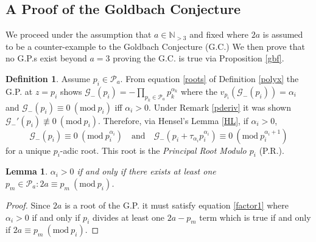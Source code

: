\documentclass[12pt,a4paper]{amsart}
\numberwithin{equation}{section}
\theoremstyle{theorem}
\theoremstyle{definition}
\newtheorem{definition}{Definition}
\newtheorem{lemma}{Lemma}
\theoremstyle{remark}
\theoremstyle{con}
\newcommand{\Mod}[1]{\ (\mathrm{mod}\ #1)}
\begin{document}
 
 
 \subsection{A Proof of the Goldbach Conjecture}
  
 We proceed under the assumption that $a \in \mathbb{N}_{>3}$ and fixed where $2a$ is assumed to be a counter-example to the Goldbach Conjecture (G.C.) We then prove that no G.P.s exist beyond $a = 3$ proving the G.C. is true via Proposition \ref{gbf}.
 
 
\begin{definition}\label{pr}
Assume $p_i \in \mathcal{P}_a$. From equation \ref{roots} of Definition \ref{polyx} the G.P. at $z = p_i$ shows $\mathcal{G}_-(p_i) = - \prod_{p_k \in \mathcal{P}_a}p_k^{\alpha_k}$ where the $v_{p_i}(\mathcal{G}_-(p_i)) = \alpha_i$ and $\mathcal{G}_-(p_i) \equiv 0 \Mod{p_i}$ iff $\alpha_i > 0$. Under Remark \ref{pderiv} it was shown $\mathcal{G}_-'(p_i) \not \equiv 0 \Mod{p_i}$. Therefore, via Hensel's Lemma \ref{HL}, if $\alpha_i > 0$,
\begin{equation}\label{pr0}
\mathcal{G}_-(p_i) \equiv 0 \Mod{p_i^{\alpha_i}} \quad \text{and} \quad \mathcal{G}_-(p_i + \tau_{\alpha_i} p_i^{\alpha_i}) \equiv 0 \Mod{p_i^{\alpha_i + 1}}
\end{equation} 
for a unique $p_i$-adic root. This root is the \textit{Principal Root Modulo $p_i$} (P.R.). 
\end{definition}

\begin{lemma}\label{iff}
\textit{$\alpha_i > 0$ if and only if there exists at least one $p_m \in \mathcal{P}_a : 2a \equiv p_m \Mod{p_i}$.}
\end{lemma}

\begin{proof}
Since $2a$ is a root of the G.P. it must satisfy equation \ref{factor1} where $\alpha_i > 0$ if and only if $p_i$ divides at least one $2a - p_m$ term which is true if and only if $2a \equiv p_m \Mod{p_i}$.
\end{proof}
\end{document}
